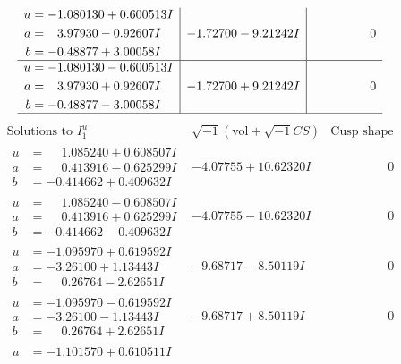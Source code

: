 \documentclass[1p]{elsarticle_modified}
\theoremstyle{definition}
\newcommand{\I}{\sqrt{-1}}
\begin{document}
$$\begin{array}{c|c|c}
\begin{aligned}
u &= -1.080130 + 0.600513 I \\
a &= \phantom{-}3.97930 - 0.92607 I \\
b &= -0.48877 + 3.00058 I\end{aligned}
 & -1.72700 - 9.21242 I & \phantom{-0.000000 } 0 \\ \hline\begin{aligned}
u &= -1.080130 - 0.600513 I \\
a &= \phantom{-}3.97930 + 0.92607 I \\
b &= -0.48877 - 3.00058 I\end{aligned}
 & -1.72700 + 9.21242 I & \phantom{-0.000000 } 0\\
 \hline 
 \end{array}$$\newpage$$\begin{array}{c|c|c}  
\text{Solutions to }I^u_{1}& \I (\text{vol} + \sqrt{-1}CS) & \text{Cusp shape}\\
 \hline 
\begin{aligned}
u &= \phantom{-}1.085240 + 0.608507 I \\
a &= \phantom{-}0.413916 - 0.625299 I \\
b &= -0.414662 + 0.409632 I\end{aligned}
 & -4.07755 + 10.62320 I & \phantom{-0.000000 } 0 \\ \hline\begin{aligned}
u &= \phantom{-}1.085240 - 0.608507 I \\
a &= \phantom{-}0.413916 + 0.625299 I \\
b &= -0.414662 - 0.409632 I\end{aligned}
 & -4.07755 - 10.62320 I & \phantom{-0.000000 } 0 \\ \hline\begin{aligned}
u &= -1.095970 + 0.619592 I \\
a &= -3.26100 + 1.13443 I \\
b &= \phantom{-}0.26764 - 2.62651 I\end{aligned}
 & -9.68717 - 8.50119 I & \phantom{-0.000000 } 0 \\ \hline\begin{aligned}
u &= -1.095970 - 0.619592 I \\
a &= -3.26100 - 1.13443 I \\
b &= \phantom{-}0.26764 + 2.62651 I\end{aligned}
 & -9.68717 + 8.50119 I & \phantom{-0.000000 } 0 \\ \hline\begin{aligned}
u &= -1.101570 + 0.610511 I \\

\end{aligned}
\end{array}$$
\end{document}
